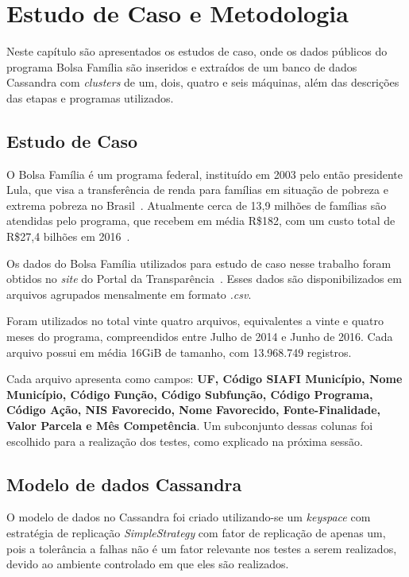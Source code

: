 

\chapter{Estudo de Caso e Metodologia}

Neste capítulo são apresentados os estudos de caso, onde os dados públicos do programa Bolsa Família são inseridos e extraídos de um banco de dados Cassandra com \emph{clusters} de um, dois, quatro e seis máquinas, além das descrições das etapas e programas utilizados.

\section{Estudo de Caso}
O Bolsa Família é um programa federal, instituído em 2003 pelo então presidente Lula, que visa a transferência de renda para famílias em situação de pobreza e extrema pobreza no Brasil~\cite{caixa-bolsafamilia}. Atualmente cerca de 13,9 milhões de famílias são atendidas pelo programa, que recebem em média R\$182, com um custo total de R\$27,4 bilhões em 2016~\cite{gov-bolsafamilia1, gov-bolsafamilia2}.

Os dados do Bolsa Família utilizados para estudo de caso nesse trabalho foram obtidos no \emph{site} do Portal da Transparência~\cite{portaldatransparencia}. Esses dados são disponibilizados em arquivos agrupados mensalmente em formato \emph{.csv}. 

Foram utilizados no total vinte quatro arquivos, equivalentes a vinte e quatro meses do programa, compreendidos entre Julho de 2014 e Junho de 2016. Cada arquivo possui em média 16GiB de tamanho, com 13.968.749 registros.

Cada arquivo apresenta como campos: \textbf{UF, Código SIAFI Município, Nome Município, Código Função, Código Subfunção, Código Programa, Código Ação, NIS Favorecido, Nome Favorecido, Fonte-Finalidade, Valor Parcela e Mês Competência}. Um subconjunto dessas colunas foi escolhido para a realização dos testes, como explicado na próxima sessão.

\section{Modelo de dados Cassandra}
O modelo de dados no Cassandra foi criado utilizando-se um \emph{keyspace} com estratégia de replicação \emph{SimpleStrategy} com fator de replicação de apenas um, pois a tolerância a falhas não é um fator relevante nos testes a serem realizados, devido ao ambiente controlado em que eles são realizados.

